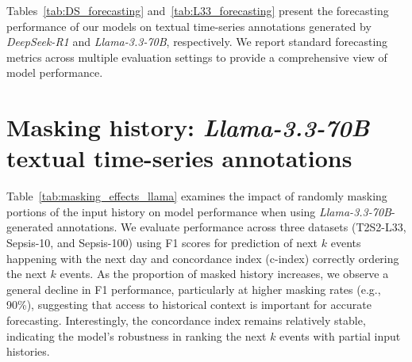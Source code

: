 


Tables~\ref{tab:DS_forecasting} and~\ref{tab:L33_forecasting} present the forecasting performance of our models on textual time-series annotations generated by \textit{DeepSeek-R1} and \textit{Llama-3.3-70B}, respectively. We report standard forecasting metrics across multiple evaluation settings to provide a comprehensive view of model performance. 

\section{Masking history: \textit{Llama-3.3-70B} textual time-series annotations}
\label{apd:masking_l33_dsr1}

Table~\ref{tab:masking_effects_llama} examines the impact of randomly masking portions of the input history on model performance when using \textit{Llama-3.3-70B}-generated annotations. 
We evaluate performance across three datasets (T2S2-L33, Sepsis-10, and Sepsis-100) using F1 scores for prediction of next \(k\) events happening with the next day and concordance index (c-index) correctly ordering the next \(k\) events. 
As the proportion of masked history increases, we observe a general decline in F1 performance, particularly at higher masking rates (e.g., 90\%), suggesting that access to historical context is important for accurate forecasting. 
Interestingly, the concordance index remains relatively stable, indicating the model's robustness in ranking the next \(k\) events with partial input histories.

\begin{table}[!htbp]
    \centering
    \caption{Effect of Randomly Masking History (\textit{Llama-3.3-70B} annotations) on F1 and Concordance. \textbf{Abbreviations}: F1(1d)-10/100: F1 (1 day) for sepsis-10 and sepsis-100 respectively. c10/100: c-index for sepsis-10 and sepsis-100 respectively.}
    \label{tab:masking_effects_llama}
\end{table}

